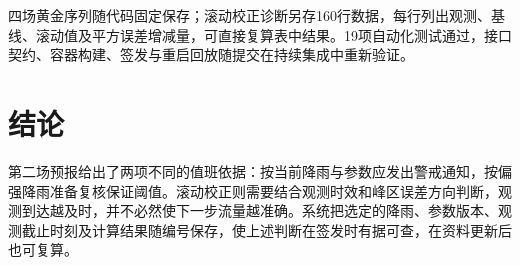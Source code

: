 四场黄金序列随代码固定保存；滚动校正诊断另存160行数据，每行列出观测、基线、滚动值及平方误差增减量，可直接复算表中结果。19项自动化测试通过，接口契约、容器构建、签发与重启回放随提交在持续集成中重新验证。

\section*{结论}
第二场预报给出了两项不同的值班依据：按当前降雨与参数应发出警戒通知，按偏强降雨准备复核保证阈值。滚动校正则需要结合观测时效和峰区误差方向判断，观测到达越及时，并不必然使下一步流量越准确。系统把选定的降雨、参数版本、观测截止时刻及计算结果随编号保存，使上述判断在签发时有据可查，在资料更新后也可复算。

